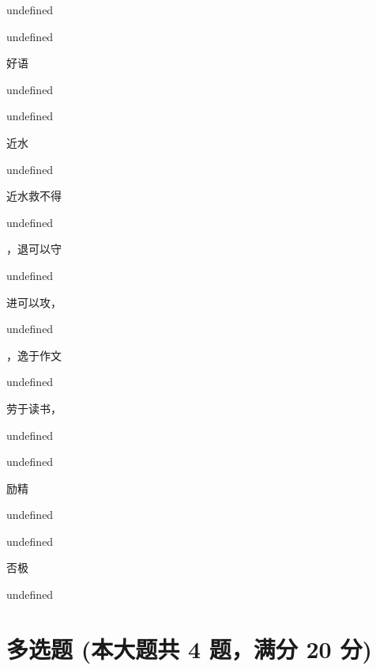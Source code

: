 \documentclass[12pt, a4paper, addpoints]{exam}
\begin{document}
\begin{multicols}{2}
\begin{questions}
undefined

\question[2] 

undefined

\question[2] 好语\fillin

undefined

\question[2] 

undefined

\question[2] 近水

undefined

\question[2] 近水救不得\fillin

undefined

\question[2] \fillin，退可以守

undefined

\question[2] 进可以攻，\fillin

undefined

\question[2] \fillin，逸于作文

undefined

\question[2] 劳于读书，\fillin

undefined

\question[2] 

undefined

\question[2] 励精\fillin

undefined

\question[2] 

undefined

\question[2] 否极\fillin

undefined
\end{questions}
\end{multicols}

\hspace{5cm}

\section{\normalsize{多选题 (本大题共 4 题，满分 20 分)}}
\hspace{1.5cm}
\end{document}
